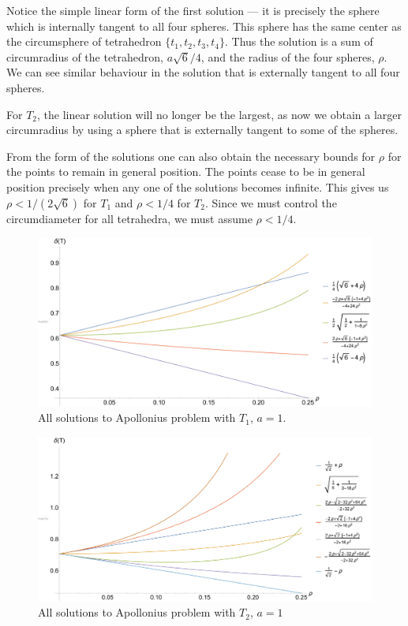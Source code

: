Notice the simple linear form of the first solution --- it is precisely the sphere which is internally tangent to all four spheres. This sphere has the same center as the circumsphere of tetrahedron $\{t_1,t_2,t_3,t_4\}$. Thus the solution is a sum of circumradius of the tetrahedron, $a \sqrt 6 /4$, and the radius of the four spheres, $\rho$. We can see similar behaviour in the solution that is externally tangent to all four spheres.

For $T_2$, the linear solution will no longer be the largest, as now we obtain a larger circumradius by using a sphere that is externally tangent to some of the spheres. 


\begin{remark}\label{rem:GP}
	From the form of the solutions one can also obtain the necessary bounds for $\rho$ for the points to remain in general position. The points cease to be in general position precisely when any one of the solutions becomes infinite. This gives us $\rho < 1/(2\sqrt 6)$ for $T_1$ and $\rho<1/4$ for $T_2$. Since we must control the circumdiameter for all tetrahedra, we must assume $\rho < 1/4$.
\end{remark}


\begin{figure}
	\includegraphics[width=1\textwidth]{../img/t1.pdf}
	\caption{All solutions to Apollonius problem with $T_1$, $a=1$.}\label{fig:Apollonius1}
\end{figure}

\begin{figure}
	\includegraphics[width=1\textwidth]{../img/t2.pdf}
	\caption{All solutions to Apollonius problem with $T_2$, $a=1$}\label{fig:Apollonius2}
\end{figure}
